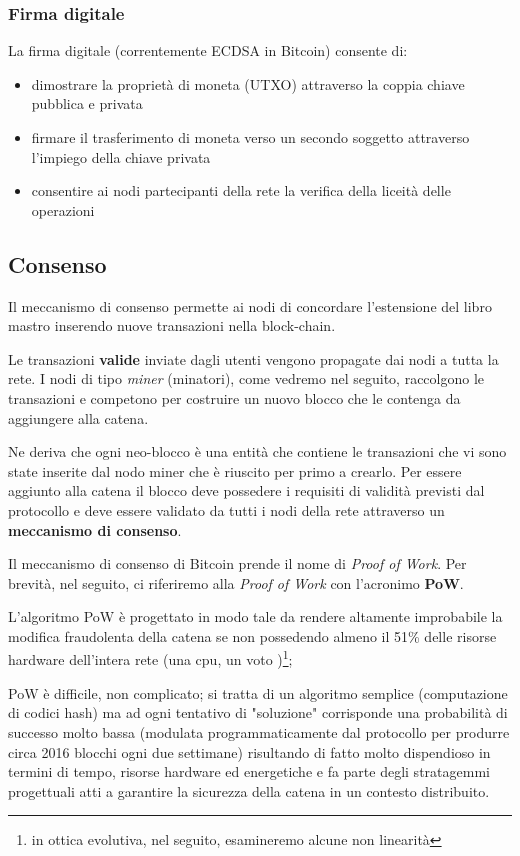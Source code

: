 \documentclass{article}
\begin{document}
\subsubsection{Firma digitale}

La firma digitale (correntemente ECDSA in Bitcoin) consente di:

\begin{itemize}
    \item dimostrare la proprietà di moneta (UTXO) attraverso la coppia chiave pubblica e privata
    \item firmare il trasferimento di moneta verso un secondo soggetto attraverso l'impiego della chiave privata
    \item consentire ai nodi partecipanti della rete la verifica della liceità delle operazioni
\end{itemize}

\subsection{Consenso}

Il meccanismo di consenso permette ai nodi di concordare l'estensione del libro mastro inserendo nuove transazioni nella block-chain.

Le transazioni \textbf{valide} inviate dagli utenti vengono propagate dai nodi a tutta la rete. I nodi di tipo \textit{miner} (minatori), come vedremo nel seguito, raccolgono le transazioni e competono per
costruire un nuovo blocco che le contenga da aggiungere alla catena. 

Ne deriva che ogni neo-blocco è una entità che contiene le transazioni che vi sono state inserite dal nodo miner che è riuscito per primo a crearlo. 
Per essere aggiunto alla catena il blocco deve possedere i requisiti di validità previsti dal protocollo e deve essere validato da tutti i nodi della rete
attraverso un \textbf{meccanismo di consenso}.

Il meccanismo di consenso di Bitcoin prende il nome di \textit{Proof of Work}.
Per brevità, nel seguito, ci riferiremo alla \textit{Proof of Work} con l'acronimo \textbf{PoW}.

L'algoritmo PoW è progettato in modo tale da rendere altamente improbabile la modifica fraudolenta della catena se non possedendo almeno il 51\% delle risorse hardware dell'intera rete (una cpu, un voto \cite{Nakamoto})\footnote{in ottica evolutiva, nel seguito, esamineremo alcune non linearità}; 

PoW è difficile, non complicato; si tratta di un algoritmo semplice (computazione di codici hash) ma ad ogni tentativo di "soluzione" corrisponde una probabilità di successo molto bassa (modulata programmaticamente dal protocollo per produrre circa 2016 blocchi ogni due settimane) risultando di fatto molto dispendioso in termini di tempo, 
risorse hardware ed energetiche e fa parte degli stratagemmi progettuali atti a garantire la sicurezza della catena in un contesto distribuito.
\end{document}
